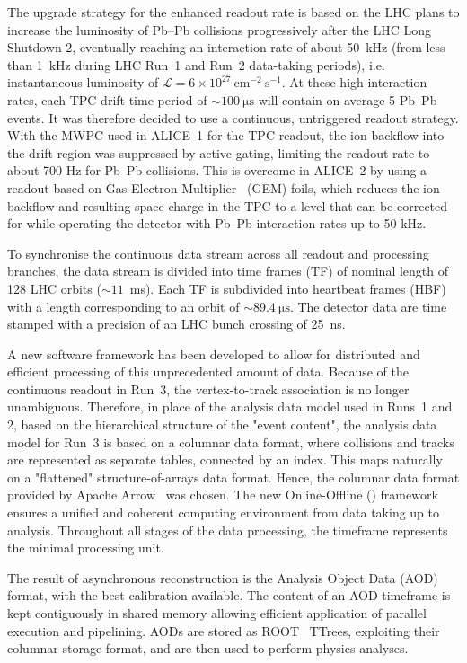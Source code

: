 The upgrade strategy for the enhanced readout rate is based on the LHC plans to increase the luminosity of Pb--Pb collisions progressively after the LHC Long Shutdown 2, eventually reaching an interaction rate of about 50~kHz (from less than 1~kHz during LHC Run~1 and Run~2 data-taking periods), i.e. instantaneous luminosity of $\mathcal{L} = 6\times10^{27}~\mathrm{cm}^{-2}~\mathrm{s}^{-1}$. At these high interaction rates, each TPC drift time period of $\sim\SI{100}{\micro\second}$ will contain on average 5 Pb--Pb events. It was therefore decided to use a continuous, untriggered readout strategy. With the MWPC used in ALICE~1 for the TPC readout, the ion backflow into the drift region was suppressed by active gating, limiting the readout rate to about 700 Hz for Pb--Pb collisions. This is overcome in ALICE~2 by using a readout based on Gas Electron Multiplier~\cite{Sauli:1997qp} (GEM) foils, which reduces the ion backflow and resulting space charge in the TPC to a level that can be corrected for while operating the detector with Pb--Pb interaction rates up to 50 kHz. 

To synchronise the continuous data stream across all readout and processing branches, the data stream is divided into time frames (TF) of nominal length of 128 LHC orbits ($\sim11$~ms). Each TF is subdivided into heartbeat frames (HBF) with a length corresponding to an orbit of $\sim\SI{89.4}{\micro\second}$. The detector data are time stamped with a precision of an LHC bunch crossing of 25~ns. 

A new software framework has been developed to allow for distributed and efficient processing of this unprecedented amount of data. Because of the continuous readout in Run~3, the vertex-to-track association is no longer unambiguous. Therefore, in place of the analysis data model used in Runs~1 and 2, based on the hierarchical structure of the "event content", the analysis data model for Run~3 is based on a columnar data format, where collisions and tracks are represented as separate tables, connected by an index. This maps naturally on a "flattened" structure-of-arrays data format. Hence, the columnar data format provided by Apache Arrow~\cite{ApacheArrow} was chosen. The new Online-Offline (\osq) framework ensures a unified and coherent computing environment from data taking up to analysis. Throughout all stages of the data processing, the timeframe represents the minimal processing unit. 

The result of asynchronous reconstruction is the Analysis Object Data (AOD) format, with the best calibration available. The content of an AOD timeframe is kept contiguously in shared memory allowing efficient application of parallel execution and pipelining. AODs are stored as ROOT~\cite{Brun:1997pa} TTrees, exploiting their columnar storage format, and are then used to perform physics analyses. 

